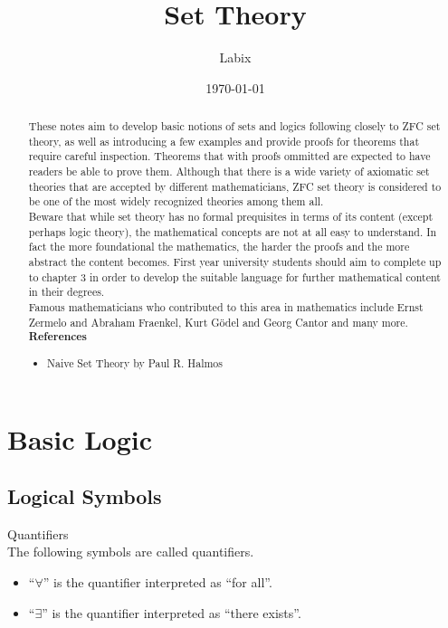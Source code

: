\documentclass[a4paper]{article}
\title{Set Theory}
\author{Labix}
\date{\today}
\begin{document}
\maketitle
\begin{abstract}
These notes aim to develop basic notions of sets and logics following closely to ZFC set theory, as well as introducing a few examples and provide proofs for theorems that require careful inspection. Theorems that with proofs ommitted are expected to have readers be able to prove them. Although that there is a wide variety of axiomatic set theories that are accepted by different mathematicians, ZFC set theory is considered to be one of the most widely recognized theories among them all. \\

Beware that while set theory has no formal prequisites in terms of its content (except perhaps logic theory), the mathematical concepts are not at all easy to understand. In fact the more foundational the mathematics, the harder the proofs and the more abstract the content becomes. First year university students should aim to complete up to chapter $3$ in order to develop the suitable language for further mathematical content in their degrees. \\

Famous mathematicians who contributed to this area in mathematics include Ernst Zermelo and Abraham Fraenkel, Kurt Gödel and Georg Cantor and many more. \\
\textbf{References}
\begin{itemize}
\item Naive Set Theory by Paul R. Halmos
\end{itemize}
\end{abstract}
\pagebreak
\tableofcontents

\pagebreak
\section{Basic Logic}
\subsection{Logical Symbols}
\begin{defn}{Quantifiers}{}\\
The following symbols are called quantifiers. 
\begin{itemize}
\item ``$\forall$'' is the quantifier interpreted as ``for all''. 
\item ``$\exists$'' is the quantifier interpreted as ``there exists''. 
\end{itemize}
\end{defn}
\end{document}
